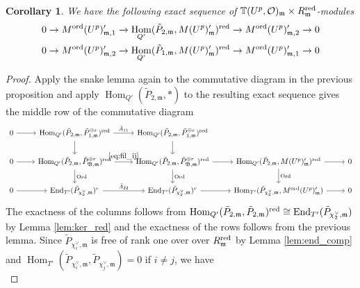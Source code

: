 \documentclass[leqno]{amsart}
\newtheorem{cor}[thm]{Corollary}
\theoremstyle{definition}
\theoremstyle{remark}
\newcommand{\oo}{\mathcal{O}}
\DeclareMathOperator{\End}{End}
\DeclareMathOperator{\Hom}{Hom}
\newcommand{\fm}{\mathfrak{m}}
\DeclareMathOperator{\Ord}{Ord} %
\newcommand{\B}{\mathfrak B} %
\newcommand{\red}{\textnormal{red}}
\newcommand{\TT}{\mathbb{T}} %
\newcommand{\ord}{\textnormal{ord}} %
\begin{document}
\begin{cor}\label{cor:fil_by_ord}
	We have the following exact sequence of
	$\TT(U^p,\oo)_\fm\times R_{\fm}^{\red}$-modules
\begin{equation*}
\begin{aligned}
	0\to M^{\ord}(U^p)_{\fm,1}'\to
	\Hom_{Q'}(\tilde{P}_{2,\fm},M(U^p)_{\fm}')^{\red}
    \to
	M^{\ord}(U^p)_{\fm,2}'\to0\\
	0\to M^{\ord}(U^p)_{\fm,2}'\to
	\Hom_{Q'}(\tilde{P}_{1,\fm},M(U^p)_{\fm}')^{\red}
    \to
	M^{\ord}(U^p)_{\fm,1}'\to0
\end{aligned}
\end{equation*}
\end{cor}
\begin{proof}
    Apply the snake lemma again to the 
    commutative diagram in the previous proposition 
    and apply $\Hom_{Q'}(\tilde{P}_{2,\fm},*)$
    to the resulting exact sequence
	gives the middle row of the commutative diagram
\begin{equation*}
    \begin{tikzcd}
	    0 \arrow[r]& 
	    \Hom_{Q'}(\tilde{P}_{2,\fm},\tilde{P}_{1,\fm}^{\oplus r})^{\red}
	    \arrow[r,"\bar{A}_{11}"] \arrow[d]&
	    \Hom_{Q'}(\tilde{P}_{2,\fm}, \tilde{P}_{1,\fm}^{\oplus r})^{\red}
	    \arrow[d] &&\\
	    0\arrow[r] & 
	    \Hom_{Q'}(\tilde{P}_{2,\fm},\tilde{P}_{\B,\fm}^{\oplus r})^{\red}
	    \arrow[r,"\eqref{eq:fil_ij}"] \arrow[d,"\Ord"] &
	    \Hom_{Q'}(\tilde{P}_{2,\fm},\tilde{P}_{\B,\fm}^{\oplus r})^{\red}
	    \arrow[d,"\Ord"] \arrow[r]&
	    \Hom_{Q'}(\tilde{P}_{2,\fm}, M(U^p)_{\fm}')^{\red}\arrow[r]
        \arrow[d,"\Ord"] &0\\
	    0\arrow[r] & 
	    \End_{T'}(\tilde{P}_{\chi_2^\vee,\fm})^{r}
	    \arrow[r,"\bar{A}_{22}"] &
	    \End_{T'}(\tilde{P}_{\chi_2^\vee,\fm})^{r}
        \arrow[r]&
        \Hom_{T'}(\tilde{P}_{\chi_2^\vee,\fm}, M^{\ord}(U^p)_\fm')
        \arrow[r]&0
    \end{tikzcd}
\end{equation*}
The exactness of the columns follows from 
$\Hom_{Q'}(\tilde{P}_{2,\fm}, \tilde{P}_{2,\fm})^{\red}
\cong \End_{T'}(\tilde{P}_{\chi_2^\vee,\fm})$
by Lemma \ref{lem:ker_red}
and the exactness of the rows follows from the previous lemma.
Since $\tilde{P}_{\chi_i^\vee,\fm}$
is free of rank one over over $R_\fm^{\red}$
by Lemma \ref{lem:end_comp} and
$\Hom_{T'}(\tilde{P}_{\chi_i^\vee,\fm},\tilde{P}_{\chi_j^\vee,\fm})=0$
if $i\neq j$, we have
\begin{equation}

\end{equation}
\end{proof}
\end{document}
